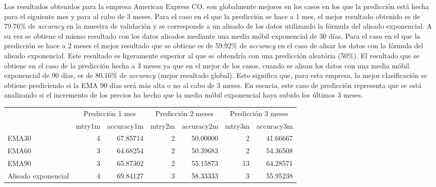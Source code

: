 \documentclass[]{DissertateUSU}
\begin{document}
\setlength\parskip{8ex}

\noindent Los resultados obtenidos para la empresa American Express CO.
son globalmente mejores en los casos en los que la predicción está hecha
para el siguiente mes y para al cabo de 3 meses. Para el caso en el que
la predicción se hace a 1 mes, el mejor resultado obtenido es de 79.76\%
de \emph{accuracy} en la muestra de validación y se corresponde a un
alisado de los datos utilizando la fórmula del alisado exponencial. A su
vez se obtiene el mismo resultado con los datos alisados mediante una
media móbil exponencial de 30 días. Para el caso en el que la predicción
se hace a 2 meses el mejor resultado que se obtiene es de 59.92\% de
\emph{accuracy} en el caso de alisar los datos con la fórmula del
alisado exponencial. Este resultado es ligeramente superior al que se
obtendría con una predicción aleatória (50\%). El resultado que se
obtiene en el caso de la predicción hecha a 3 meses ya que en el mejor
de los casos, cuando se alisan los datos con una media móbil exponencial
de 90 días, es de 80.16\% de \emph{accuracy} (mejor resultado global).
Esto significa que, para esta empresa, la mejor clasificación se obtiene
prediciendo si la EMA 90 días será más alta o no al cabo de 3 meses. En
esencia, este caso de predicción representa que se está analizando si el
incremento de los precios ha hecho que la media móbil exponencial haya
subido los últimos 3 meses.

\begin{table}[H]
\centering\begingroup\fontsize{10}{12}\selectfont

\begin{tabular}{l|r|r|r|r|r|r}
\hline
\multicolumn{1}{c|}{ } & \multicolumn{2}{c|}{Predicción 1 mes} & \multicolumn{2}{c|}{Predicción 2 meses} & \multicolumn{2}{c}{Predicción 3 meses} \\
\cline{2-3} \cline{4-5} \cline{6-7}
  & mtry1m & accuracy1m & mtry2m & accuracy2m & mtry3m & accuracy3m\\
\hline
EMA30 & 4 & 67.85714 & 2 & 50.00000 & 2 & 41.66667\\
\hline
EMA60 & 3 & 64.68254 & 2 & 50.39683 & 2 & 54.36508\\
\hline
EMA90 & 3 & 65.87302 & 2 & 55.15873 & 13 & 64.28571\\
\hline
Alisado exponencial & 4 & 69.84127 & 3 & 58.33333 & 3 & 55.95238\\
\hline
\end{tabular}
\endgroup{}
\end{table}
\end{document}

